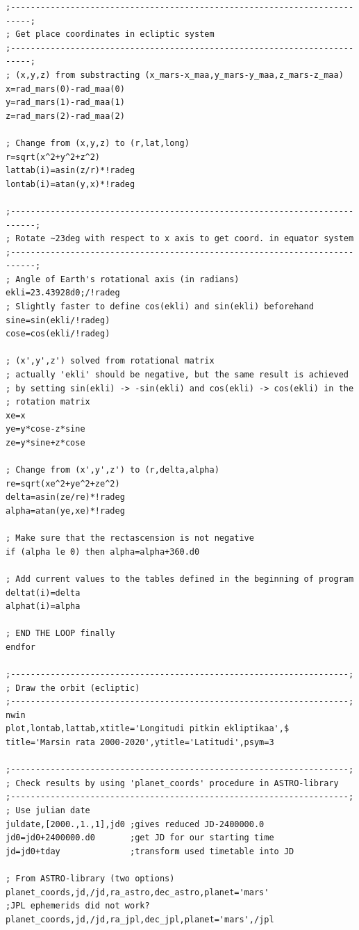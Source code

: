 \documentclass[12pt, a4paper]{article}
\begin{document}
\begin{scriptsize}
\begin{verbatim}
;--------------------------------------------------------------------------;
; Get place coordinates in ecliptic system
;--------------------------------------------------------------------------;
; (x,y,z) from substracting (x_mars-x_maa,y_mars-y_maa,z_mars-z_maa)
x=rad_mars(0)-rad_maa(0)
y=rad_mars(1)-rad_maa(1)
z=rad_mars(2)-rad_maa(2)

; Change from (x,y,z) to (r,lat,long)
r=sqrt(x^2+y^2+z^2)
lattab(i)=asin(z/r)*!radeg
lontab(i)=atan(y,x)*!radeg

;---------------------------------------------------------------------------;
; Rotate ~23deg with respect to x axis to get coord. in equator system
;---------------------------------------------------------------------------;
; Angle of Earth's rotational axis (in radians)
ekli=23.43928d0;/!radeg
; Slightly faster to define cos(ekli) and sin(ekli) beforehand
sine=sin(ekli/!radeg)
cose=cos(ekli/!radeg)

; (x',y',z') solved from rotational matrix
; actually 'ekli' should be negative, but the same result is achieved
; by setting sin(ekli) -> -sin(ekli) and cos(ekli) -> cos(ekli) in the
; rotation matrix
xe=x
ye=y*cose-z*sine
ze=y*sine+z*cose

; Change from (x',y',z') to (r,delta,alpha)
re=sqrt(xe^2+ye^2+ze^2)
delta=asin(ze/re)*!radeg
alpha=atan(ye,xe)*!radeg

; Make sure that the rectascension is not negative
if (alpha le 0) then alpha=alpha+360.d0

; Add current values to the tables defined in the beginning of program
deltat(i)=delta
alphat(i)=alpha

; END THE LOOP finally
endfor

;--------------------------------------------------------------------;
; Draw the orbit (ecliptic)
;--------------------------------------------------------------------;
nwin
plot,lontab,lattab,xtitle='Longitudi pitkin ekliptikaa',$
title='Marsin rata 2000-2020',ytitle='Latitudi',psym=3

;--------------------------------------------------------------------;
; Check results by using 'planet_coords' procedure in ASTRO-library
;--------------------------------------------------------------------;
; Use julian date
juldate,[2000.,1.,1],jd0 ;gives reduced JD-2400000.0
jd0=jd0+2400000.d0       ;get JD for our starting time
jd=jd0+tday              ;transform used timetable into JD

; From ASTRO-library (two options)
planet_coords,jd,/jd,ra_astro,dec_astro,planet='mars'
;JPL ephemerids did not work?
planet_coords,jd,/jd,ra_jpl,dec_jpl,planet='mars',/jpl


\end{verbatim}
\end{scriptsize}
\end{document}
